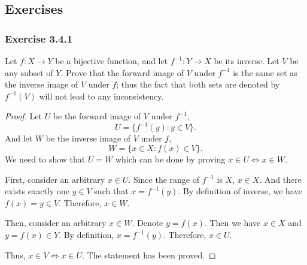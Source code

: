 \documentclass[12pt, letter]{article}
\begin{document}
\subsection*{Exercises}
\subsubsection*{Exercise 3.4.1}
Let $f:X\to Y$ be a bijective function, and let $f^{-1}:Y\to X$ be its inverse. Let $V$ be any subset of $Y$.
Prove that the forward image of $V$ under $f^{-1}$ is the same set as the inverse image of $V$ under $f$; thus the fact that 
both sets are denoted by $f^{-1}(V)$ will not lead to any inconsistency.
\begin{proof}
    Let $U$ be the forward image of $V$ under $f^{-1}$,
    \begin{equation*}
        U=\{f^{-1}(y):y\in V\}.
    \end{equation*}
    And let $W$ be the inverse image of $V$ under $f$,
    \begin{equation*}
        W=\{x\in X: f(x)\in V\}.
    \end{equation*}
    We need to show that $U=W$ which can be done by proving $x\in U\iff x\in W$. 

    First, consider an arbitrary $x\in U$. Since the range of $f^{-1}$ is $X$, $x\in X$. And there exists exactly one $y\in V$ such that $x=f^{-1}(y)$. 
    By definition of inverse, we have $f(x)=y\in V$. Therefore, $x\in W$.

    Then, consider an arbitrary $x\in W$. Denote $y=f(x)$. Then we have $x\in X$ and $y=f(x)\in Y$. By definition, $x=f^{-1}(y)$. Therefore, $x\in U$.
    
    Thus, $x\in V\iff x\in U$. The statement has been proved. 
\end{proof}
\end{document}
